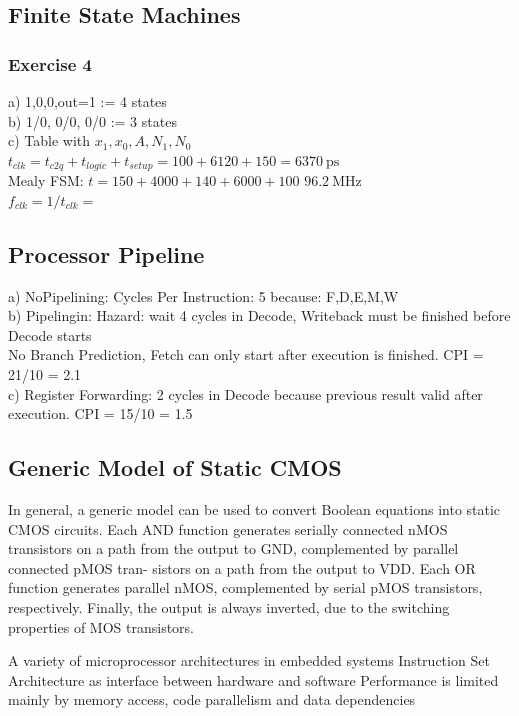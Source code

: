 \begin{sectionbox}
	\subsection{Finite State Machines}
	

		\subsubsection{Exercise 4}
		a) 1,0,0,out=1 := 4 states\\ 
		b) 1/0, 0/0, 0/0 := 3 states\\
		c) Table with $x_1,x_0,A,N_1,N_0$\\

	$t_{clk} = t_{c2q} + t_{logic} + t_{setup} = 100 + 6120 + 150 = \SI{6370}{\pico\second}$\\
	Mealy FSM: $t = 150 + 4000 + 140 + 6000 + 100$ \qquad $\SI{96.2}{\mega\hertz}$\\
	$f_{clk} = 1/t_{clk} = $
\end{sectionbox}


\begin{sectionbox}
	\subsection{Processor Pipeline}
	a) NoPipelining: Cycles Per Instruction: 5 because: F,D,E,M,W\\
	b) Pipelingin: Hazard: wait 4 cycles in Decode, Writeback must be finished before Decode starts\\
		No Branch Prediction, Fetch can only start after execution is finished. CPI = 21/10 = 2.1\\
	c) Register Forwarding: 2 cycles in Decode because previous result valid after execution. CPI = 15/10 = 1.5\\


\end{sectionbox}


\begin{sectionbox}
	\subsection{Generic Model of Static CMOS}
In general, a generic model can be used to convert Boolean equations into static
CMOS circuits. Each AND function generates serially connected nMOS transistors
on a path from the output to GND, complemented by parallel connected pMOS tran-
sistors on a path from the output to VDD. Each OR function generates parallel
nMOS, complemented by serial pMOS transistors, respectively. Finally, the output is
always inverted, due to the switching properties of MOS transistors.
\end{sectionbox}

A variety of microprocessor architectures in embedded systems
Instruction Set Architecture as interface between hardware
and software
Performance is limited mainly by memory access, code
parallelism and data dependencies
